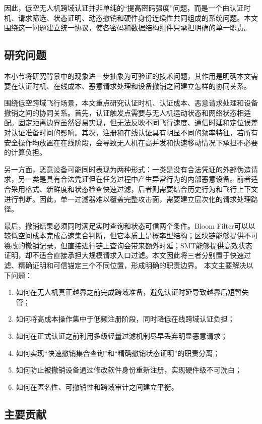 \documentclass[conference]{IEEEtran}
\begin{document}
	因此，低空无人机跨域认证并非单纯的“提高密码强度”问题，而是一个由认证时机、请求筛选、状态证明、动态撤销和硬件身份连续性共同组成的系统问题。本文围绕这一问题建立统一协议，使各密码和数据结构组件只承担明确的单一职责。
	
	\subsection{研究问题}
	
	本小节将研究背景中的现象进一步抽象为可验证的技术问题，其作用是明确本文需要在认证时机、在线成本、恶意请求处理和设备撤销之间建立怎样的协同关系。
	
	围绕低空跨域飞行场景，本文重点研究认证时机、认证成本、恶意请求处理和设备撤销之间的协同关系。首先，认证触发点需要与无人机运动状态和网络状态相适配。固定距离边界虽然容易实现，但无法反映不同飞行速度、通信时延和定位误差对认证准备时间的影响。其次，注册和在线认证具有明显不同的频率特征，若所有安全操作均放置在在线阶段，会导致无人机在高并发和快速移动情况下承担不必要的计算负担。
	
	另一方面，恶意设备可能同时表现为两种形式：一类是没有合法凭证的外部伪造请求，另一类是具有合法凭证但在任务过程中产生异常行为的内部恶意设备。前者适合采用格式、新鲜度和状态检查快速过滤，后者则需要结合历史行为和飞行上下文进行判断。因此，单一过滤器难以覆盖完整攻击面，需要建立层次化的请求处理路径。
	
	最后，撤销结果必须同时满足实时查询和状态可信两个条件。Bloom Filter可以以较低空间成本完成高速集合判断，但它本质上是概率型结构；区块链能够提供不可篡改的撤销记录，但直接进行链上查询会带来额外时延；SMT能够提供高效状态证明，却不适合直接承担大规模请求入口过滤。本文因此将三者分别置于快速过滤、精确证明和可信锚定三个不同位置，形成明确的职责边界。
	本文主要解决以下问题：
	\begin{enumerate}
		\item 如何在无人机真正越界之前完成跨域准备，避免认证时延导致越界后短暂失管；
		\item 如何将高成本操作集中于低频注册阶段，同时降低在线跨域认证负担；
		\item 如何在正式认证之前利用多级轻量过滤机制尽早丢弃明显恶意请求；
		\item 如何实现“快速撤销集合查询”和“精确撤销状态证明”的职责分离；
		\item 如何防止被撤销设备通过修改软件身份重新注册，实现硬件级不可洗白；
		\item 如何在匿名性、可撤销性和跨域审计之间建立平衡。
	\end{enumerate}
	
	\subsection{主要贡献}
	
\end{document}
